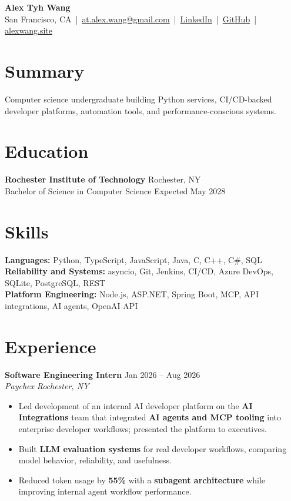 \documentclass[10pt,letterpaper]{article}
\newif\ifresumeFirstRole
\newcommand{\resumeRole}[4]{%
  \ifresumeFirstRole
    \global\resumeFirstRolefalse
  \else
    \vspace{0pt plus 1fill}%
  \fi
  \textbf{#1} \hfill #2\\
  \textit{#3} \hfill \textit{#4}
}
\begin{document}
\begin{center}
{\Large \textbf{Alex Tyh Wang}}\\
San Francisco, CA \,|\, \href{mailto:at.alex.wang@gmail.com}{at.alex.wang@gmail.com} \,|\, \href{https://www.linkedin.com/in/alex-tyh-wang/}{LinkedIn} \,|\, \href{https://github.com/alextyhwang}{GitHub} \,|\, \href{https://alexwang.site}{alexwang.site}
\end{center}

\section*{Summary}
Computer science undergraduate building Python services, CI/CD-backed developer platforms, automation tools, and performance-conscious systems.

\section*{Education}
\textbf{Rochester Institute of Technology} \hfill Rochester, NY\\
Bachelor of Science in Computer Science \hfill Expected May 2028

\section*{Skills}
\textbf{Languages:} Python, TypeScript, JavaScript, Java, C, C++, C\#, SQL\\
\textbf{Reliability and Systems:} asyncio, Git, Jenkins, CI/CD, Azure DevOps, SQLite, PostgreSQL, REST\\
\textbf{Platform Engineering:} Node.js, ASP.NET, Spring Boot, MCP, API integrations, AI agents, OpenAI API

\section*{Experience}
\resumeRole{Software Engineering Intern}{Jan 2026 -- Aug 2026}{Paychex}{Rochester, NY}
\begin{itemize}
  \item Led development of an internal AI developer platform on the \textbf{AI Integrations} team that integrated \textbf{AI agents and MCP tooling} into enterprise developer workflows; presented the platform to executives.
  \item Built \textbf{LLM evaluation systems} for real developer workflows, comparing model behavior, reliability, and usefulness.
  \item Reduced token usage by \textbf{55\%} with a \textbf{subagent architecture} while improving internal agent workflow performance.
\end{itemize}
\end{document}
